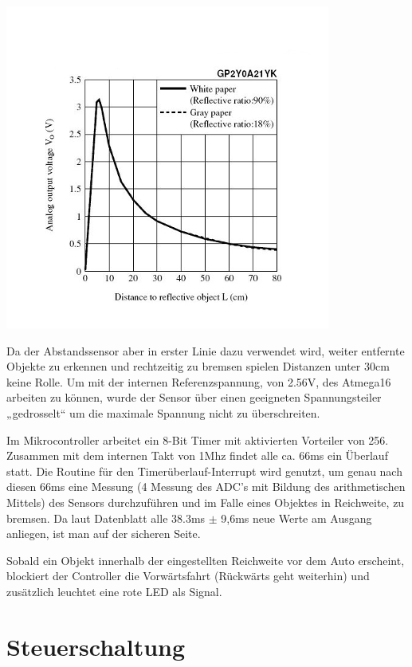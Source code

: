 \documentclass{scrartcl}
\begin{document}
			\includegraphics{images/sensordiagramm.png}

			Da der Abstandssensor aber in erster Linie dazu verwendet wird,
			weiter entfernte Objekte zu erkennen und rechtzeitig zu bremsen spielen Distanzen unter 30cm keine Rolle.
			Um mit der internen Referenzspannung, von 2.56V, des Atmega16 arbeiten zu können,
			wurde der Sensor über einen geeigneten Spannungsteiler „gedrosselt“ um die maximale Spannung nicht zu überschreiten. 

			Im Mikrocontroller arbeitet ein 8-Bit Timer mit aktivierten Vorteiler von 256.
			Zusammen mit dem internen Takt von 1Mhz findet alle ca. 66ms ein Überlauf statt.
			Die Routine für den Timerüberlauf-Interrupt wird genutzt,
			um genau nach diesen 66ms eine Messung (4 Messung des ADC's mit Bildung des arithmetischen Mittels)
			des Sensors durchzuführen und im Falle eines Objektes in Reichweite, zu bremsen.
			Da laut Datenblatt alle 38.3ms $\pm$ 9,6ms neue Werte am Ausgang anliegen, ist man auf der sicheren Seite. 

			Sobald ein Objekt innerhalb der eingestellten Reichweite vor dem Auto erscheint,
			blockiert der Controller die Vorwärtsfahrt (Rückwärts geht weiterhin)
			und zusätzlich leuchtet eine rote LED als Signal.

	

\newpage

\section{Steuerschaltung}
\end{document}
